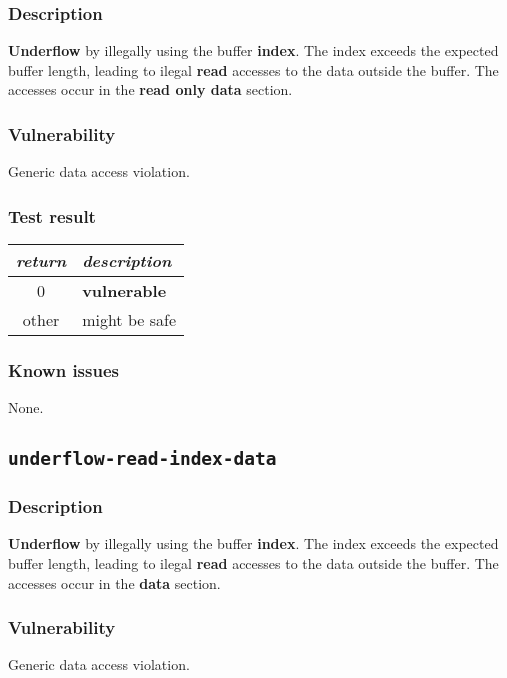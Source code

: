 \documentclass[a4paper]{book}
\begin{document}
\subsubsection{Description}

\textbf{Underflow} by illegally using the buffer \textbf{index}.
The index exceeds the expected buffer length,
leading to ilegal \textbf{read} accesses to the data outside the buffer.
The accesses occur in the \textbf{read only data} section.

\subsubsection{Vulnerability}
Generic data access violation.

\subsubsection{Test result}

\begin{tabular}{cl}
  \toprule
  \emph{return}  & \emph{description} \\
  \midrule
  0              & \textbf{vulnerable} \\
  other          & might be safe \\
  \bottomrule
\end{tabular}

\subsubsection{Known issues}

None.

\newpage

\subsection{\texttt{underflow-read-index-data}}\label{test-underflow-read-index-data}

\subsubsection{Description}

\textbf{Underflow} by illegally using the buffer \textbf{index}.
The index exceeds the expected buffer length,
leading to ilegal \textbf{read} accesses to the data outside the buffer.
The accesses occur in the \textbf{data} section.

\subsubsection{Vulnerability}
Generic data access violation.
\end{document}
